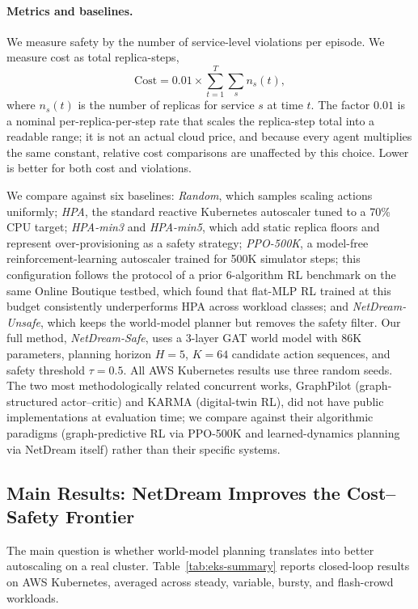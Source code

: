 \paragraph{Metrics and baselines.}
We measure safety by the number of service-level violations per episode.
We measure cost as total replica-steps,
\[
\mathrm{Cost}
=
0.01 \times \sum_{t=1}^{T}\sum_{s} n_s(t),
\]
where $n_s(t)$ is the number of replicas for service $s$ at time $t$.
The factor $0.01$ is a nominal per-replica-per-step rate that scales the
replica-step total into a readable range; it is not an actual cloud
price, and because every agent multiplies the same constant, relative
cost comparisons are unaffected by this choice.
Lower is better for both cost and violations.

We compare against six baselines: \emph{Random}, which samples scaling
actions uniformly; \emph{HPA}, the standard reactive Kubernetes
autoscaler tuned to a 70\% CPU target; \emph{HPA-min3} and
\emph{HPA-min5}, which add static replica floors and represent
over-provisioning as a safety strategy; \emph{PPO-500K}, a model-free
reinforcement-learning autoscaler trained for 500K simulator steps;
this configuration follows the protocol of a prior 6-algorithm RL
benchmark on the same Online Boutique testbed, which found that
flat-MLP RL trained at this budget consistently underperforms HPA
across workload classes; and
\emph{NetDream-Unsafe}, which keeps the world-model planner but removes
the safety filter. Our full method, \emph{NetDream-Safe}, uses a
3-layer GAT world model with 86K parameters, planning horizon $H=5$,
$K=64$ candidate action sequences, and safety threshold $\tau=0.5$.
All AWS Kubernetes results use three random seeds. The two most
methodologically related concurrent works, GraphPilot
\citep{chen2025graphpilot} (graph-structured actor--critic) and KARMA
\citep{karma2025} (digital-twin RL), did not have public
implementations at evaluation time; we compare against their algorithmic
paradigms (graph-predictive RL via PPO-500K and learned-dynamics
planning via NetDream itself) rather than their specific systems.

\subsection{Main Results: NetDream Improves the Cost--Safety Frontier}
\label{sec:main-results}

The main question is whether world-model planning translates into better
autoscaling on a real cluster. Table~\ref{tab:eks-summary} reports
closed-loop results on AWS Kubernetes, averaged across steady, variable,
bursty, and flash-crowd workloads.


